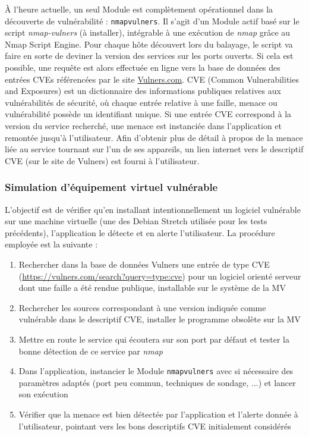 \documentclass[]{article}
\begin{document}
À l'heure actuelle, un seul Module est complètement opérationnel dans la découverte de vulnérabilité : \texttt{nmapvulners}. Il s'agit d'un Module actif basé sur le script \textit{nmap-vulners} (à installer), intégrable à une exécution de \textit{nmap} grâce au Nmap Script Engine. Pour chaque hôte découvert lors du balayage, le script va faire en sorte de deviner la version des services sur les ports ouverts. Si cela est possible, une requête est alors effectuée en ligne vers la base de données des entrées CVEs référencées par le site \href{https://vulners.com/}{Vulners.com}. CVE (Common Vulnerabilities and Exposures) est un dictionnaire des informations publiques relatives aux vulnérabilités de sécurité, où chaque entrée relative à une faille, menace ou vulnérabilité possède un identifiant unique. Si une entrée CVE correspond à la version du service recherché, une menace est instanciée dans l'application et remontée jusqu'à l'utilisateur. Afin d'obtenir plus de détail à propos de la menace liée au service tournant sur l'un de ses appareils, un lien internet vers le descriptif CVE (sur le site de Vulners) est fourni à l'utilisateur.

\subsubsection{Simulation d'équipement virtuel vulnérable}

L'objectif est de vérifier qu'en installant intentionnellement un logiciel vulnérable sur une machine virtuelle (une des Debian Stretch utilisée pour les tests précédents), l'application le détecte et en alerte l'utilisateur. La procédure employée est la suivante :

\begin{enumerate}
\item Rechercher dans la base de données Vulners une entrée de type CVE (\url{https://vulners.com/search?query=type:cve}) pour un logiciel orienté serveur dont une faille a été rendue publique, installable sur le système de la MV
\vspace{0.1cm}
\item Rechercher les sources correspondant à une version indiquée comme vulnérable dans le descriptif CVE, installer le programme obsolète sur la MV
\vspace{0.1cm}
\item Mettre en route le service qui écoutera sur son port par défaut et tester la bonne détection de ce service par \textit{nmap}
\vspace{0.1cm}
\item Dans l'application, instancier le Module \texttt{nmapvulners} avec si nécessaire des paramètres adaptés (port peu commun, techniques de sondage, ...) et lancer son exécution
\vspace{0.1cm}
\item Vérifier que la menace est bien détectée par l'application et l'alerte donnée à l'utilisateur, pointant vers les bons descriptifs CVE initialement considérés
\end{enumerate}
\end{document}
